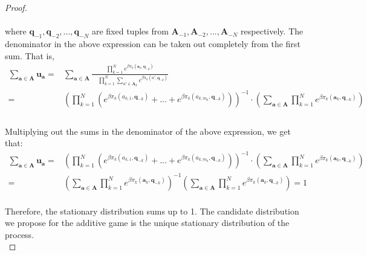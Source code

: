 \documentclass[11pt]{article}
\theoremstyle{plainCl1}
\theoremstyle{plainCl2}
\newcommand{\A}{\mathbf{A}}
\newcommand{\abf}{\mathbf{a}}
\newcommand{\qbf}{\mathbf{q}}
\newcommand{\ubf}{\mathbf{u}}
\begin{document}
\begin{proof}
\noindent \\ \\ where $\qbf_{-1}, \qbf_{-2},...,\qbf_{-N}$ are fixed tuples from $\A_{-1}, \A_{-2},...,\A_{-N}$ respectively. The denominator in the above expression can be taken out completely from the first sum. That is, \\
\begin{align}
\sum_{\abf \in \A} \ubf_\abf = &\sum_{\abf \in \A} \frac{\displaystyle \prod_{k=1}^N e^{\beta \pi_k(\abf_k, \qbf_{-k})}}{\displaystyle \quad \prod_{k=1}^N \sum_{a' \in \A_k} e^{\beta \pi_k(a',\qbf_{-k})}} \\[15pt]
=& \left( \displaystyle \prod_{k=1}^N \left( e^{\beta \pi_k(a_{k,1}, \qbf_{-k})}+... + e^{\beta \pi_k(a_{k,m_k}, \qbf_{-k})} \right) \right)^{-1} \cdot \left( \sum_{\abf \in \A} \displaystyle \prod_{k=1}^N e^{\beta \pi_k(\abf_k, \qbf_{-k})} \right) \\
\end{align} \\
\noindent Multiplying out the sums in the denominator of the above expression, we get that:
\begin{align}
\sum_{\abf \in \A} \ubf_\abf =& \left( \displaystyle \prod_{k=1}^N \left( e^{\beta \pi_k(a_{k,1}, \qbf_{-k})}+... + e^{\beta \pi_k(a_{k,m_k}, \qbf_{-k})} \right) \right)^{-1} \cdot \left( \sum_{\abf \in \A} \displaystyle \prod_{k=1}^N e^{\beta \pi_k(\abf_k, \qbf_{-k})} \right) \\[10pt]
=& \left( \sum_{\abf \in \A} \displaystyle \prod_{k=1}^N e^{\beta \pi_k(\abf_k, \qbf_{-k})}  \right)^{-1} \left( \sum_{\abf \in \A} \displaystyle \prod_{k=1}^N e^{\beta \pi_k(\abf_k, \qbf_{-k})}  \right) = 1
\end{align} \\ 
\noindent Therefore, the stationary distribution sums up to 1. The candidate distribution we propose for the additive game is the unique stationary distribution of the process.\\
\end{proof}
\end{document}
